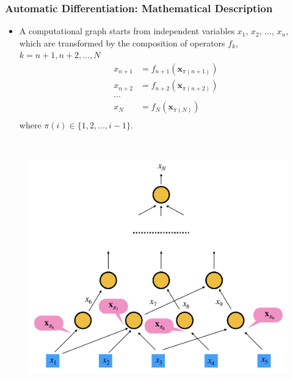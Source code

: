 \documentclass{beamer}
\begin{document}
\begin{frame}
	\frametitle{Automatic Differentiation: Mathematical Description}
	\begin{minipage}[t]{0.49\textwidth}
	\begin{itemize}
		\item A computational graph starts from independent variables $x_1$, $x_2$, $\ldots$, $x_n$, which are transformed by the composition of operators $f_k$, $k = n+1, n+2, \ldots, N$
		$$\begin{aligned}
    x_{n+1} &= f_{n+1}(\mathbf{x}_{\pi({n+1})})\\
    x_{n+2} &= f_{n+2}(\mathbf{x}_{\pi({n+2})})\\
    \ldots\\
    x_{N} &= f_{N}(\mathbf{x}_{\pi({N})})\\
\end{aligned}$$
where $\pi(i) \in \{1,2,\ldots,i-1\}$. 
\end{itemize}
\end{minipage}~
\begin{minipage}[t]{0.49\textwidth}
  \begin{figure}[hbt]
  \includegraphics[width=1.0\textwidth]{../cg}
\end{figure}
\end{minipage}
\end{frame}
\end{document}
